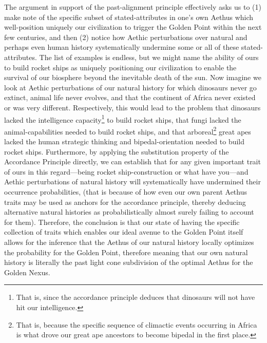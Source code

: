 \documentclass[11pt]{article}
\numberwithin{equation}{section}
\theoremstyle{plain}
\theoremstyle{definition}
\theoremstyle{remark}
\begin{document}
The argument in support of the past-alignment principle effectively asks us to (1) make note of the specific subset of stated-attributes in one's own Aethus which well-position uniquely our civilization to trigger the Golden Point within the next few centuries, and then (2) notice how Aethic perturbations over natural and perhaps even human history systematically undermine some or all of these stated-attributes. The list of examples is endless, but we might name the ability of ours to build rocket ships as uniquely positioning our civilization to enable the survival of our biosphere beyond the inevitable death of the sun. Now imagine we look at Aethic perturbations of our natural history for which dinosaurs never go extinct, animal life never evolves, and that the continent of Africa never existed or was very different. Respectively, this would lead to the problem that dinosaurs lacked the intelligence capacity\footnote{That is, since the accordance principle deduces that dinosaurs will not have hit our intelligence.} to build rocket ships, that fungi lacked the animal-capabilities needed to build rocket ships, and that arboreal\footnote{That is, because the specific sequence of climactic events occurring in Africa is what drove our great ape ancestors to become bipedal in the first place.} great apes lacked the human strategic thinking and bipedal-orientation needed to build rocket ships. Furthermore, by applying the substitution property of the Accordance Principle \cite{Nexus} directly, we can establish that for any given important trait of ours in this regard---being rocket ship-construction or what have you---and Aethic perturbations of natural history will systematically have undermined their occurrence probabilities, (that is because of how even our own parent Aethus traits may be used as anchors for the accordance principle, thereby deducing alternative natural histories as probabilistically almost surely failing to account for them). Therefore, the conclusion is that our state of having the specific collection of traits which enables our ideal avenue to the Golden Point itself allows for the inference that the Aethus of our natural history locally optimizes the probability for the Golden Point, therefore meaning that our own natural history is literally the past light cone subdivision of the optimal Aethus for the Golden Nexus. 
\end{document}
